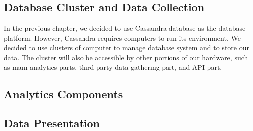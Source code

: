 
\subsection{Database Cluster and Data Collection}
\label{subsec:database-data}
In the previous chapter, we decided to use Cassandra database as the database platform. However, Cassandra requires computers to run its environment. We decided to use clusters of computer to manage database system and to store our data. The cluster will also be accessible by other portions of our hardware, such as main analytics parts, third party data gathering part, and API part.


\subsection{Analytics Components}
\label{subsec:analytics}

\subsection{Data Presentation}
\label{subsec:data-presentation}

